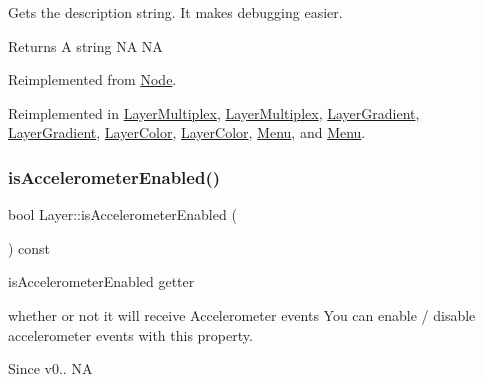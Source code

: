Gets the description string. It makes debugging easier. \begin{DoxyReturn}{Returns}
A string  NA  NA 
\end{DoxyReturn}


Reimplemented from \hyperlink{classNode_a41710375a0d92a4ee54c39fe123b5912}{Node}.



Reimplemented in \hyperlink{classLayerMultiplex_ab87bcf38601d2ef54325b95e22565d31}{Layer\+Multiplex}, \hyperlink{classLayerMultiplex_a60e44b51edd0e10a3601bf5e5094c30d}{Layer\+Multiplex}, \hyperlink{classLayerGradient_ace9ed0ed0422bdc89a7e440a9f8307d3}{Layer\+Gradient}, \hyperlink{classLayerGradient_a95a281f25e6c4196664e9866e451fcc2}{Layer\+Gradient}, \hyperlink{classLayerColor_a363da7455314bdf8a5fd4f809e70796e}{Layer\+Color}, \hyperlink{classLayerColor_aae6932d9d9e0ae21cc34e1e37d0b2d92}{Layer\+Color}, \hyperlink{classMenu_ac8ea6b6d3296f7c973e1d82051425afe}{Menu}, and \hyperlink{classMenu_a2f8bee450bcae21f9d5f27941467ff59}{Menu}.

\mbox{\label{classLayer_ab9ea31abf3231b9a5086173228df9e46}} 
\subsubsection{\texorpdfstring{is\+Accelerometer\+Enabled()}{isAccelerometerEnabled()}\hspace{0.1cm}{\footnotesize\ttfamily [1/2]}}
{\footnotesize\ttfamily bool Layer\+::is\+Accelerometer\+Enabled (\begin{DoxyParamCaption}{ }\end{DoxyParamCaption}) const\hspace{0.3cm}{\ttfamily [virtual]}}



is\+Accelerometer\+Enabled getter 

whether or not it will receive Accelerometer events You can enable / disable accelerometer events with this property. \begin{DoxySince}{Since}
v0..  NA 
\end{DoxySince}
\mbox{\label{classLayer_af95bbd9e4e412e8f1d3a28c9dc9a7ce2}} 
